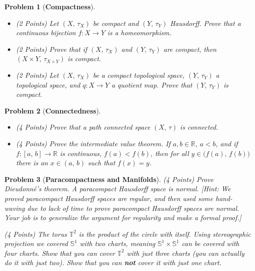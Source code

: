 \documentclass{article}
\theoremstyle{normal}
\newtheorem{problem}{Problem}
\begin{document}
    \clearpage
    \begin{problem}[\textbf{Compactness}]
        \par\hfill\par\vspace{2em}
        \begin{itemize}
            \item
            (2 Points) Let $(X,\,\tau_{X})$ be compact and
            $(Y,\,\tau_{Y})$ Hausdorff. Prove that a continuous bijection
            $f:X\rightarrow{Y}$ is a homeomorphism.
            \item
            (2 Points)
            Prove that if $(X,\,\tau_{X})$ and $(Y,\,\tau_{Y})$ are
            compact, then $(X\times{Y},\,\tau_{X\times{Y}})$ is compact.
            \item
            (2 Points)
            Let $(X,\,\tau_{X})$ be a compact topological space,
            $(Y,\,\tau_{Y})$ a topological space, and $q:X\rightarrow{Y}$ a
            quotient map. Prove that $(Y,\,\tau_{Y})$ is compact.
        \end{itemize}
    \end{problem}
    \clearpage
    \begin{problem}[\textbf{Connectedness}]
        \par\hfill\par\vspace{2em}
        \begin{itemize}
            \item
            (4 Points)
            Prove that a path connected space $(X,\,\tau)$ is connected.
            \item
            (4 Points)
            Prove the intermediate value theorem. If
            $a,b\in\mathbb{R}$, $a<b$, and if $f:[a,\,b]\rightarrow\mathbb{R}$
            is continuous, $f(a)<f(b)$, then for all
            $y\in\big(f(a),\,f(b)\big)$ there is an $x\in(a,\,b)$ such that
            $f(x)=y$.
        \end{itemize}
    \end{problem}
    \clearpage
    \begin{problem}[\textbf{Paracompactness and Manifolds}]
        \item
        (4 Points)
        Prove Dieudonn\'{e}'s theorem. A paracompact Hausdorff space is normal.
        [Hint: We proved paracompact Hausdorff spaces are regular, and then
        used some \textit{hand-waving} due to lack of time to prove paracompact
        Hausdorff spaces are normal. Your job is to generalize the argument for
        regularity and make a formal proof.]
        \item
        (4 Points)
        The torus $\mathbb{T}^{2}$ is the product of the circle with itself.
        Using stereographic projection we covered $\mathbb{S}^{1}$ with
        two charts, meaning $\mathbb{S}^{1}\times\mathbb{S}^{1}$ can be
        covered with four charts. Show that you can cover $\mathbb{T}^{2}$
        with just three charts (you can actually do it with just two). Show
        that you can \textbf{not} cover it with just one chart.
    \end{problem}
\end{document}
